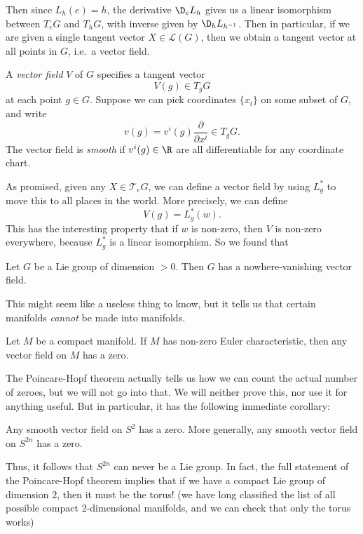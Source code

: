 \documentclass[a4paper]{article}
\begin{document}
Then since $L_h(e) = h$, the derivative $\D_e L_h$ gives us a linear isomorphism between $T_e G$ and $T_h G$, with inverse given by $\D_h L_{h^{-1}}$. Then in particular, if we are given a single tangent vector $X \in \mathcal{L}(G)$, then we obtain a tangent vector at all points in $G$, i.e.\ a vector field.

\begin{defi}
  A \emph{vector field} $V$ of $G$ specifies a tangent vector
  \[
    V(g) \in T_gG
  \]
  at each point $g \in G$. Suppose we can pick coordinates $\{x_i\}$ on some subset of $G$, and write
  \[
    v(g) = v^i (g) \frac{\partial}{\partial x^i} \in T_g G.
  \]
  The vector field is \emph{smooth} if $v^i(g) \in \R$ are all differentiable for any coordinate chart.
\end{defi}

As promised, given any $X \in \mathcal{T}_eG$, we can define a vector field by using $L_g^*$ to move this to all places in the world. More precisely, we can define
\[
  V(g) = L_g^*(w).
\]
This has the interesting property that if $w$ is non-zero, then $V$ is non-zero everywhere, because $L_g^*$ is a linear isomorphism. So we found that

\begin{prop}
  Let $G$ be a Lie group of dimension $> 0$. Then $G$ has a nowhere-vanishing vector field.
\end{prop}
This might seem like a useless thing to know, but it tells us that certain manifolds \emph{cannot} be made into manifolds.

\begin{thm}
  Let $M$ be a compact manifold. If $M$ has non-zero Euler characteristic, then any vector field on $M$ has a zero.
\end{thm}
The Poincare-Hopf theorem actually tells us how we can count the actual number of zeroes, but we will not go into that. We will neither prove this, nor use it for anything useful. But in particular, it has the following immediate corollary:
\begin{thm}
  Any smooth vector field on $S^2$ has a zero. More generally, any smooth vector field on $S^{2n}$ has a zero.
\end{thm}
Thus, it follows that $S^{2n}$ can never be a Lie group. In fact, the full statement of the Poincare-Hopf theorem implies that if we have a compact Lie group of dimension $2$, then it must be the torus! (we have long classified the list of all possible compact 2-dimensional manifolds, and we can check that only the torus works)
\end{document}
